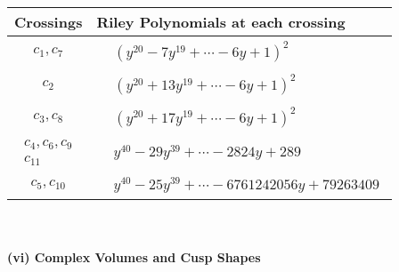 \documentclass[1p]{elsarticle_modified}
\theoremstyle{definition}
\begin{document}
\begin{tabular}{m{50pt}|m{274pt}}
Crossings & \hspace{64pt}Riley Polynomials at each crossing \\
\hline $$\begin{aligned}c_{1},c_{7}\end{aligned}$$&$\begin{aligned}
&(y^{20}-7 y^{19}+\cdots-6 y+1)^{2}
\end{aligned}$\\
\hline $$\begin{aligned}c_{2}\end{aligned}$$&$\begin{aligned}
&(y^{20}+13 y^{19}+\cdots-6 y+1)^{2}
\end{aligned}$\\
\hline $$\begin{aligned}c_{3},c_{8}\end{aligned}$$&$\begin{aligned}
&(y^{20}+17 y^{19}+\cdots-6 y+1)^{2}
\end{aligned}$\\
\hline $$\begin{aligned}c_{4},c_{6},c_{9}\\c_{11}\end{aligned}$$&$\begin{aligned}
&y^{40}-29 y^{39}+\cdots-2824 y+289
\end{aligned}$\\
\hline $$\begin{aligned}c_{5},c_{10}\end{aligned}$$&$\begin{aligned}
&y^{40}-25 y^{39}+\cdots-6761242056 y+79263409
\end{aligned}$\\
\hline
\end{tabular}\\~\\
\newpage\flushleft \textbf{(vi) Complex Volumes and Cusp Shapes}
\end{document}
